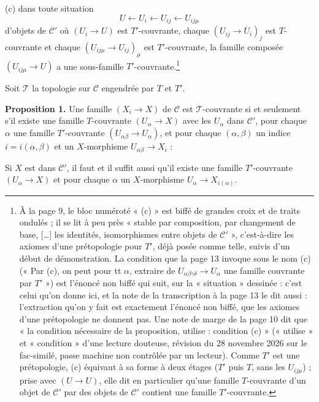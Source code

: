 \documentclass[11pt,a4paper]{article}
\begin{document}
(c) dans toute situation
\[
  U \longleftarrow U_i \longleftarrow U_{ij} \longleftarrow U_{ij\mu}
\]
d'objets de $\mathcal{C}'$ où $(U_i \to U)$ est $T'$-couvrante, chaque $(U_{ij}
\to U_i)_j$ est $T$-couvrante et chaque $(U_{ij\mu} \to U_{ij})_\mu$ est
$T'$-couvrante, la famille composée $(U_{ij\mu} \to U)$ a une sous-famille
$T'$-couvrante.\footnote{À la page 9, le bloc numéroté « (c) » est biffé de
grandes croix et de traits ondulés ; il se lit à peu près « stable par
composition, par changement de base, […] les identités, isomorphismes entre
objets de $\mathcal{C}'$ », c'est-à-dire les axiomes d'une prétopologie pour
$T'$, déjà posée comme telle, suivis d'un début de démonstration. La condition
que la page 13 invoque sous le nom (c) (« Par (c), on peut pour tt $\alpha$,
extraire de $U_{\alpha\beta\gamma\delta} \to U_\alpha$ une famille couvrante
par $T'$ ») est l'énoncé non biffé qui suit, sur la « situation » dessinée :
c'est celui qu'on donne ici, et la note de la transcription à la page 13 le
dit aussi : l'extraction qu'on y fait est exactement l'énoncé non biffé, que
les axiomes d'une prétopologie ne donnent pas. Une note de marge de la page 10 dit que « la
condition nécessaire de la proposition, utilise : condition (c) » (« utilise » et
« condition » d'une lecture douteuse, révision du 28 novembre 2026 sur le fac-similé, passe machine non contrôlée par un lecteur). Comme $T'$ est une
prétopologie, (c) équivaut à sa forme à deux étages ($T'$ puis $T$, sans les
$U_{ij\mu}$) ; prise avec $(U \to U)$, elle dit en particulier qu'une famille
$T$-couvrante d'un objet de $\mathcal{C}'$ par des objets de $\mathcal{C}'$
contient une famille $T'$-couvrante.}

Soit $\mathcal{T}$ la topologie sur $\mathcal{C}$ engendrée par $T$ et $T'$.

\textbf{Proposition 1.} Une famille $(X_i \to X)$ de $\mathcal{C}$ est
$\mathcal{T}$-couvrante si et seulement s'il existe une famille $T$-couvrante
$(U_\alpha \to X)$ avec les $U_\alpha$ dans $\mathcal{C}'$, pour chaque
$\alpha$ une famille $T'$-couvrante $(U_{\alpha\beta} \to U_\alpha)$, et pour
chaque $(\alpha, \beta)$ un indice $i = i(\alpha, \beta)$ et un
$X$-morphisme $U_{\alpha\beta} \to X_i$ :


Si $X$ est dans $\mathcal{C}'$, il faut et il suffit aussi qu'il
existe une famille $T'$-couvrante $(U_\alpha \to X)$ et pour chaque $\alpha$
un $X$-morphisme $U_\alpha \to X_{i(\alpha)}$.
\end{document}
